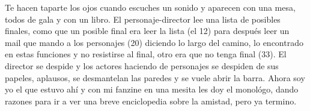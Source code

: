 \documentclass{article}
\begin{document}
  Te hacen taparte los ojos cuando escuches un sonido y  aparecen con una mesa, todos de gala y con un libro. El personaje-director lee una lista de posibles finales, como que un posible final era leer la lista (el 12) para después leer un  mail que mando a los personajes (20) diciendo lo largo del camino, lo encontrado en estas funciones y no resistirse al final, otro era que no tenga final (33). El director se despide y los actores haciendo de personajes se despiden de sus papeles, aplausos, se desmantelan las paredes y se vuele abrir la barra. Ahora soy yo el que estuvo ahí y con mi fanzine en una mesita les doy el monológo, dando razones para ir a ver una breve enciclopedia sobre la amistad, pero ya termino. 
\end{document}

